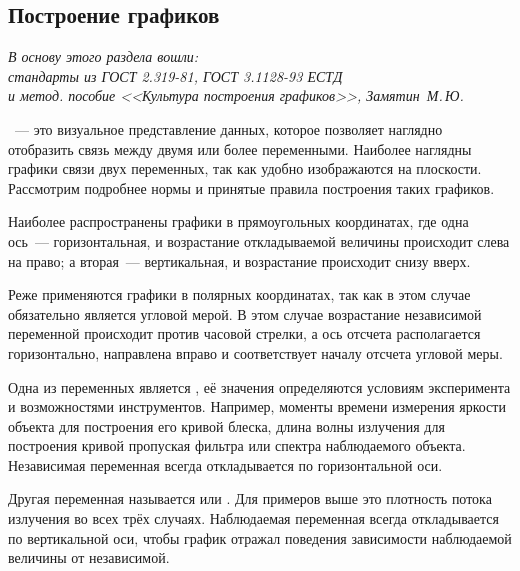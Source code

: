 \subsection{Построение графиков}
\label{sec:plotting}

\begin{flushright}
    \small
    \itshape В основу этого раздела вошли:\\ стандарты из ГОСТ 2.319-81, ГОСТ 3.1128-93 ЕСТД\\ и метод. пособие <<Культура построения графиков>>, Замятин~М.\,Ю.
\end{flushright}

~--- это визуальное представление данных, которое позволяет наглядно отобразить связь между двумя или более переменными. Наиболее наглядны графики связи двух переменных, так как удобно изображаются на плоскости. Рассмотрим подробнее нормы и принятые правила построения таких графиков.

Наиболее распространены графики в прямоугольных координатах, где одна ось~--- горизонтальная, и возрастание откладываемой величины происходит слева на право; а вторая~--- вертикальная, и возрастание происходит снизу вверх. 

Реже применяются графики в полярных координатах, так как в этом случае  обязательно является угловой мерой. В этом случае возрастание независимой переменной происходит против часовой стрелки, а ось отсчета  располагается горизонтально, направлена вправо и соответствует началу отсчета угловой меры.

Одна из переменных является , её значения определяются условиям эксперимента и возможностями инструментов. Например, моменты времени измерения яркости объекта для построения его кривой блеска, длина волны излучения для построения кривой пропуская фильтра или спектра наблюдаемого объекта. Независимая переменная всегда откладывается по горизонтальной оси.

Другая переменная называется  или . Для примеров выше это плотность потока излучения во всех трёх случаях. Наблюдаемая переменная всегда откладывается по вертикальной оси, чтобы график отражал поведения зависимости наблюдаемой величины от независимой.

